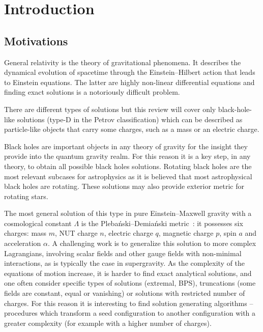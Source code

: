 \section{Introduction}
\label{sec:intro}


\subsection{Motivations}


General relativity is the theory of gravitational phenomena.
It describes the dynamical evolution of spacetime through the Einstein--Hilbert action that leads to Einstein equations.
The latter are highly non-linear differential equations and finding exact solutions is a notoriously difficult problem.

There are different types of solutions but this review will cover only black-hole-like solutions (type-D in the Petrov classification) which can be described as particle-like objects that carry some charges, such as a mass or an electric charge.

Black holes are important objects in any theory of gravity for the insight they provide into the quantum gravity realm.
For this reason it is a key step, in any theory, to obtain all possible black holes solutions.
Rotating black holes are the most relevant subcases for astrophysics as it is believed that most astrophysical black holes are rotating.
These solutions may also provide exterior metric for rotating stars.

The most general solution of this type in pure Einstein--Maxwell gravity with a cosmological constant $\Lambda$ is the Plebański--Demiański metric~\cite{Plebanski:1975:ClassSolutionsEinsteinMaxwell, Plebanski:1976:RotatingChargedUniformly}: it possesses six charges: mass $m$, NUT charge $n$, electric charge $q$, magnetic charge $p$, spin $a$ and acceleration $\alpha$.
A challenging work is to generalize this solution to more complex Lagrangians, involving scalar fields and other gauge fields with non-minimal interactions, as is typically the case in supergravity.
As the complexity of the equations of motion increase, it is harder to find exact analytical solutions, and one often consider specific types of solutions (extremal, BPS), truncations (some fields are constant, equal or vanishing) or solutions with restricted number of charges.
For this reason it is interesting to find solution generating algorithms -- procedures which transform a seed configuration to another configuration with a greater complexity (for example with a higher number of charges).

